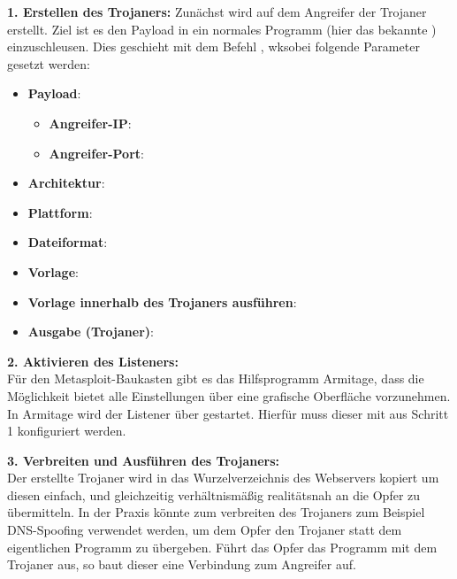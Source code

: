 \textbf{1. Erstellen des Trojaners: } 
Zunächst wird auf dem Angreifer der Trojaner erstellt.
Ziel ist es den Payload  in ein normales Programm (hier das bekannte ) einzuschleusen. 
Dies geschieht mit dem Befehl  \cite{OSMSFV}, wksobei folgende Parameter gesetzt werden:
\begin{itemize}
	\item \textbf{Payload}: \\
	      \begin{itemize}
		      \item  \textbf{Angreifer-IP}: 
		      \item \textbf{Angreifer-Port}: 
		  \end{itemize}
	\item \textbf{Architektur}: 
	\item \textbf{Plattform}: 
	\item \textbf{Dateiformat}: 
	\item \textbf{Vorlage}: 
	\item \textbf{Vorlage innerhalb des Trojaners ausführen}: 
	\item \textbf{Ausgabe (Trojaner)}: 
\end{itemize}

\bigskip
\textbf{2. Aktivieren des Listeners: } \hfill \\
Für den Metasploit-Baukasten gibt es das Hilfsprogramm Armitage, dass die Möglichkeit bietet alle Einstellungen über eine grafische Oberfläche vorzunehmen.
In Armitage wird der Listener über  gestartet. Hierfür muss dieser mit  aus Schritt 1 konfiguriert werden.


\textbf{3. Verbreiten und Ausführen des Trojaners: } \hfill \\
Der erstellte Trojaner wird in das Wurzelverzeichnis des Webservers  kopiert um diesen einfach, und gleichzeitig verhältnismäßig realitätsnah an die Opfer zu übermitteln.
In der Praxis könnte zum verbreiten des Trojaners zum Beispiel DNS-Spoofing verwendet werden, um dem Opfer den Trojaner statt dem eigentlichen Programm zu übergeben.
Führt das Opfer das Programm mit dem Trojaner aus, so baut dieser eine Verbindung zum Angreifer auf. 


